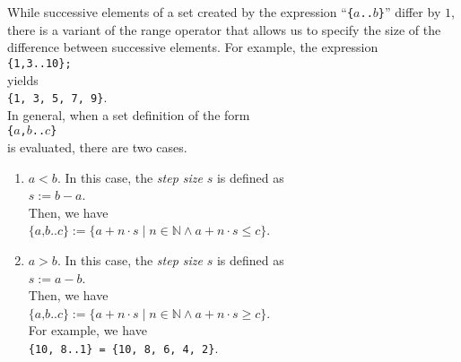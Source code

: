 While successive elements of a set created by the expression ``\texttt{\{$a$..$b$\}}''
differ by $1$, there is a variant of the range operator that allows us to
specify the size of the difference between successive elements.   For example, the expression
\\[0.2cm]
\hspace*{1.3cm}
\texttt{\{1,3..10\};}
\\[0.2cm]
yields
\\[0.2cm]
\hspace*{1.3cm}
\texttt{\{1, 3, 5, 7, 9\}}.
\\[0.2cm]
In general, when a set definition of the form
\\[0.2cm]
\hspace*{1.3cm}
\texttt{\{$a$,$b$..$c$\}}
\\[0.2cm]
is evaluated, there are two cases.
\begin{enumerate}
\item $a < b$.  In this case, the \textsl{step size} $s$ is defined as
      \\[0.2cm]
      \hspace*{1.3cm}
      $s := b - a$.
      \\[0.2cm]
      Then, we have
      \\[0.2cm]
      \hspace*{1.3cm}
      $\texttt{\{$a$,$b$..$c$\}} := 
       \{ a + n \cdot s \mid n \in \mathbb{N} \wedge a + n \cdot s \leq c  \}
      $.
\item $a > b$.  In this case, the \textsl{step size} $s$ is defined as
      \\[0.2cm]
      \hspace*{1.3cm}
      $s := a - b$.
      \\[0.2cm]
      Then, we have
      \\[0.2cm]
      \hspace*{1.3cm}
      $\texttt{\{$a$,$b$..$c$\}} := 
       \{ a + n \cdot s \mid n \in \mathbb{N} \wedge a + n \cdot s \geq c  \}
      $.
      \\[0.2cm]
      For example, we have
      \\[0.2cm]
      \hspace*{1.3cm}
      \texttt{\{10, 8..1\} = \{10, 8, 6, 4, 2\}}.
\end{enumerate}

